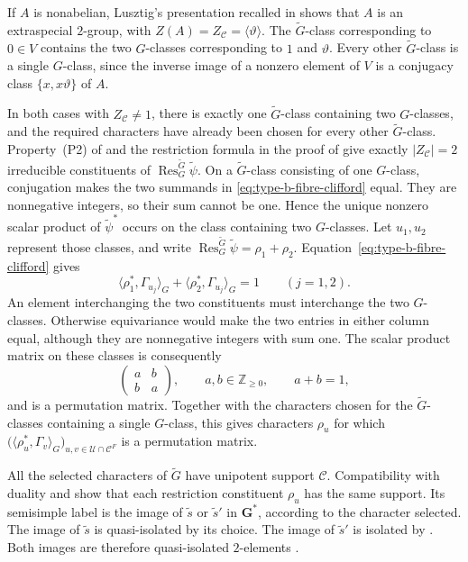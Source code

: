 \documentclass[10pt]{amsart}
\theoremstyle{definition}
\renewcommand{\geq}{\geqslant}
\let\oldendproof\endproof
\renewenvironment{proof}[1][\proofname]{%
  \oldproof[\bfseries #1]%
}{\oldendproof}
\numberwithin{equation}{section}
\numberwithin{table}{section}
\begin{document}
\begin{proof}
If $A$ is nonabelian, Lusztig's presentation recalled in
\cite[pp.~45--46]{Taylor2013} shows that $A$ is an extraspecial
$2$-group, with
$Z(A)=Z_{\mathcal C}=\langle\vartheta\rangle$.
The $\widetilde G$-class corresponding to $0\in V$ contains the two
$G$-classes corresponding to $1$ and $\vartheta$.
Every other $\widetilde G$-class is a single $G$-class, since the
inverse image of a nonzero element of $V$ is a conjugacy class
$\{x,x\vartheta\}$ of $A$.

In both cases with $Z_{\mathcal C}\ne1$, there is exactly one $\widetilde
G$-class containing two $G$-classes, and the required characters have already
been chosen for every other $\widetilde G$-class. Property~(P2) of
\cite[Theorem~3.2]{Taylor2013} and the restriction
formula in the proof of \cite[Theorem~3.1]{Taylor2013} give
exactly $|Z_{\mathcal C}|=2$ irreducible constituents of
$\operatorname{Res}^{\widetilde G}_G\widetilde\psi$.
On a $\widetilde G$-class consisting of one $G$-class, conjugation
makes the two summands in \eqref{eq:type-b-fibre-clifford} equal.
They are nonnegative integers, so their sum cannot be one.
Hence the unique nonzero scalar product of $\widetilde\psi^*$ occurs
on the class containing two $G$-classes.
Let $u_1,u_2$ represent those classes, and write
$\operatorname{Res}^{\widetilde G}_G\widetilde\psi=\rho_1+\rho_2$.
Equation~\eqref{eq:type-b-fibre-clifford} gives
\[
 \langle\rho_1^*,\Gamma_{u_j}\rangle_G+
 \langle\rho_2^*,\Gamma_{u_j}\rangle_G=1
 \qquad(j=1,2).
\]
An element interchanging the two constituents must interchange the
two $G$-classes. Otherwise equivariance would make the two entries
in either column equal, although they are nonnegative integers with
sum one. The scalar product matrix on these classes is consequently
\[
 \begin{pmatrix}a&b\\ b&a\end{pmatrix},
 \qquad a,b\in\mathbb Z_{\geq0},\qquad a+b=1,
\]
and is a permutation matrix. Together with the characters chosen for
the $\widetilde G$-classes containing a single $G$-class, this gives characters $\rho_u$ for which
$\bigl(\langle\rho_u^*,\Gamma_v\rangle_G\bigr)_{u,v\in\mathcal U\cap\mathcal C^F}$
is a permutation matrix.

All the selected characters of $\widetilde G$ have unipotent support
$\mathcal C$. Compatibility with duality and
\cite[Lemmas~14.12 and~14.15]{Taylor2016} show that each restriction
constituent $\rho_u$ has the same support.
Its semisimple label is the image of $\widetilde s$ or
$\widetilde s'$ in $\mathbf G^*$, according to the character selected.
The image of $\widetilde s$ is quasi-isolated by its choice. The image of $\widetilde s'$ is isolated by
\cite[Proposition~2.3(b)]{Bonnafe2005}.
Both images are therefore quasi-isolated $2$-elements
\cite[Proposition~5.3(a)]{Bonnafe2005}.


\end{proof}
\end{document}
